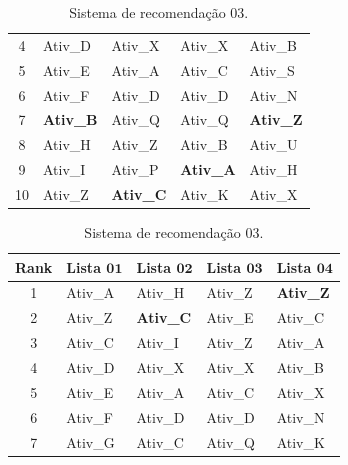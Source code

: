 \begin{table}[!htbp]
\begin{subtable}{.5\linewidth}
\begin{tabular}{cllll}
      		4                & Ativ\_D   			& Ativ\_X    			& Ativ\_X    		& Ativ\_B	                 \\
      		5                & Ativ\_E   			& Ativ\_A	  			& Ativ\_C    		& Ativ\_S	                 \\
      		6                & Ativ\_F   			& Ativ\_D    			& Ativ\_D    		& Ativ\_N                    \\
      		7                & \textbf{Ativ\_B}		& Ativ\_Q				& Ativ\_Q    		& \textbf{Ativ\_Z}           \\
      		8                & Ativ\_H   			& Ativ\_Z    			& Ativ\_B   		& Ativ\_U	                 \\
      		9                & Ativ\_I    			& Ativ\_P   			& \textbf{Ativ\_A}	& Ativ\_H	                 \\
      		10               & Ativ\_Z   			& \textbf{Ativ\_C}		& Ativ\_K    		& Ativ\_X           \\ \hline
      		\end{tabular}
      	\caption{Sistema de recomendação \(03\).}
      	\label{TABELAO:SISTEMA_RECOMENDACAO_03}
      \end{subtable}%
      \begin{subtable}{.5\linewidth}
         		\centering
         		\begin{tabular}{cllll} \hline 
         		\textbf{Rank} & \textbf{Lista} \(\mathbf{01}\) & \textbf{Lista} \(\mathbf{02}\) & \textbf{Lista} \(\mathbf{03}\) & \textbf{Lista} \(\mathbf{04}\) \\ \hline 
         		1                & Ativ\_A			    & Ativ\_H    			& Ativ\_Z   		& \textbf{Ativ\_Z}           \\
         		2                & Ativ\_Z    			& \textbf{Ativ\_C}		& Ativ\_E   		& Ativ\_C 	                 \\
         		3                & Ativ\_C    			& Ativ\_I    			& Ativ\_Z			& Ativ\_A                    \\
         		4                & Ativ\_D   			& Ativ\_X    			& Ativ\_X    		& Ativ\_B	                 \\
         		5                & Ativ\_E   			& Ativ\_A			  	& Ativ\_C    		& Ativ\_X 	         		 \\
         		6                & Ativ\_F   			& Ativ\_D    			& Ativ\_D    		& Ativ\_N                    \\
         		7                & Ativ\_G   			& Ativ\_C    			& Ativ\_Q    		& Ativ\_K	                 \\

\end{tabular}
\end{subtable}
\end{table}
